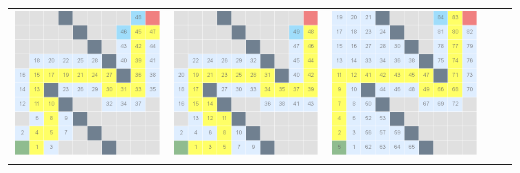 \documentclass{article}
\begin{document}
\begin{center}
\begin{tabular}{c c c c c}
\includegraphics[scale=0.15]{images/scr7.png} &
\includegraphics[scale=0.15]{images/scr8.png} &
\includegraphics[scale=0.15]{images/scr9.png} \\

\end{tabular}
\end{center}
\end{document}
